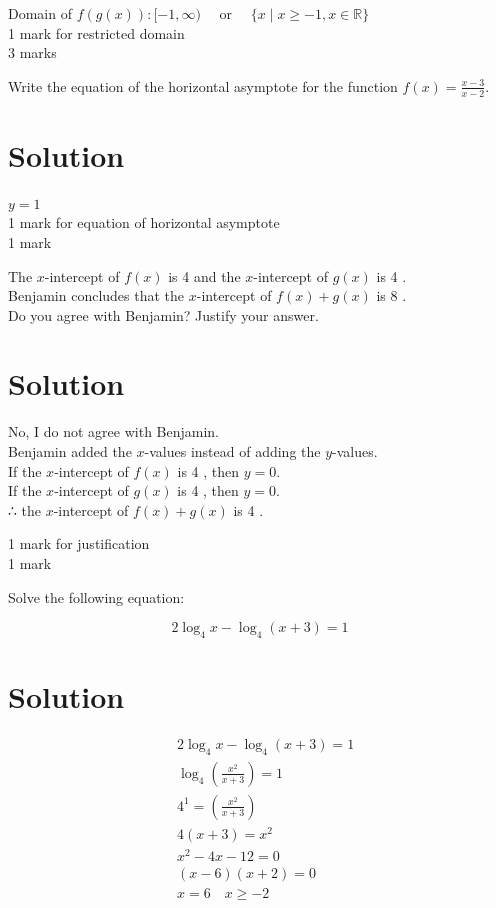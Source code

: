 \documentclass[10pt]{article}
\begin{document}
Domain of $f(g(x)):[-1, \infty) \quad$ or $\quad\{x \mid x \geq-1, x \in \mathbb{R}\}$\\
1 mark for restricted domain\\
3 marks

Write the equation of the horizontal asymptote for the function $f(x)=\frac{x-3}{x-2}$.

\section*{Solution}
$y=1$\\
1 mark for equation of horizontal asymptote\\
1 mark

The $x$-intercept of $f(x)$ is 4 and the $x$-intercept of $g(x)$ is 4 .\\
Benjamin concludes that the $x$-intercept of $f(x)+g(x)$ is 8 .\\
Do you agree with Benjamin? Justify your answer.

\section*{Solution}
No, I do not agree with Benjamin.\\
Benjamin added the $x$-values instead of adding the $y$-values.\\
If the $x$-intercept of $f(x)$ is 4 , then $y=0$.\\
If the $x$-intercept of $g(x)$ is 4 , then $y=0$.\\
∴ the $x$-intercept of $f(x)+g(x)$ is 4 .

1 mark for justification\\
1 mark

Solve the following equation:

$$
2 \log _{4} x-\log _{4}(x+3)=1
$$

\section*{Solution}
$$
\begin{aligned}
& 2 \log _{4} x-\log _{4}(x+3)=1 \\
& \log _{4}\left(\frac{x^{2}}{x+3}\right)=1 \\
& 4^{1}=\left(\frac{x^{2}}{x+3}\right) \\
& 4(x+3)=x^{2} \\
& x^{2}-4 x-12=0 \\
&(x-6)(x+2)=0 \\
& x=6 \quad x \geq-2
\end{aligned}
$$
\end{document}
